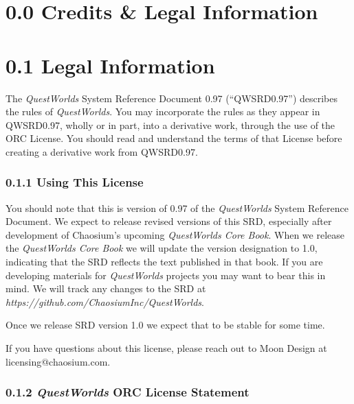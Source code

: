 \documentclass[
  11pt,
]{article}
\author{}
\date{}
\begin{document}
{
\setcounter{tocdepth}{3}
\tableofcontents
}
\hypertarget{credits-legal-information}{%
\section{0.0 Credits \& Legal
Information}\label{credits-legal-information}}

\hypertarget{legal-information}{%
\section{0.1 Legal Information}\label{legal-information}}

The \emph{QuestWorlds} System Reference Document 0.97 (``QWSRD0.97'')
describes the rules of \emph{QuestWorlds}. You may incorporate the rules
as they appear in QWSRD0.97, wholly or in part, into a derivative work,
through the use of the ORC License. You should read and understand the
terms of that License before creating a derivative work from QWSRD0.97.

\hypertarget{using-this-license}{%
\subsubsection{0.1.1 Using This License}\label{using-this-license}}

You should note that this is version of 0.97 of the \emph{QuestWorlds}
System Reference Document. We expect to release revised versions of this
SRD, especially after development of Chaosium's upcoming
\emph{QuestWorlds Core Book}. When we release the \emph{QuestWorlds Core
Book} we will update the version designation to 1.0, indicating that the
SRD reflects the text published in that book. If you are developing
materials for \emph{QuestWorlds} projects you may want to bear this in
mind. We will track any changes to the SRD at
\emph{https://github.com/ChaosiumInc/QuestWorlds}.

Once we release SRD version 1.0 we expect that to be stable for some
time.

If you have questions about this license, please reach out to Moon
Design at licensing@chaosium.com.

\hypertarget{questworlds-orc-license-statement}{%
\subsubsection{\texorpdfstring{0.1.2 \emph{QuestWorlds} ORC License
Statement}{0.1.2 QuestWorlds ORC License Statement}}\label{questworlds-orc-license-statement}}
\end{document}
